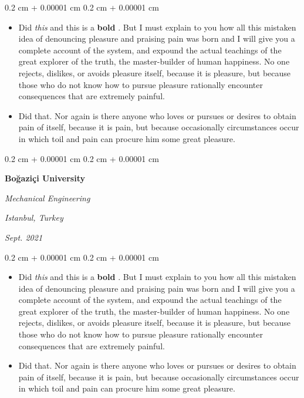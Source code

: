\documentclass[10pt, letterpaper]{article}
\newenvironment{highlights}{
    \begin{itemize}[
        topsep=0.10 cm,
        parsep=0.10 cm,
        partopsep=0pt,
        itemsep=0pt,
        leftmargin=0.4 cm + 10pt + 0.6 cm
    ]
}{
    \end{itemize}
} %
\newenvironment{onecolentry}{
    \begin{adjustwidth}{
        0.2 cm + 0.00001 cm
    }{
        0.2 cm + 0.00001 cm
    }
}{
    \end{adjustwidth}
} %
\newenvironment{threecolentry}[3][]{
    \onecolentry
    \def\thirdColumn{#3}
    \setcolumnwidth{0.6 cm, \fill, 4.5 cm}
    \begin{paracol}{3}
    #2 \switchcolumn
}{
    \switchcolumn \raggedleft \thirdColumn
    \end{paracol}
    \endonecolentry
} %
\let\hrefWithoutArrow\href
\renewcommand{\href}[2]{\hrefWithoutArrow{#1}{\mbox{\ifthenelse{\equal{#2}{}}{ }{#2 }\raisebox{.15ex}{\footnotesize \faExternalLink*}}}}
\begin{document}
        \vspace{0.10 cm-3px}
        \begin{onecolentry}
            \begin{highlights}
                \item Did \textit{this} and this is a \textbf{bold} \href{https://example.com}{link}. But I must explain to you how all this mistaken idea of denouncing pleasure and praising pain was born and I will give you a complete account of the system, and expound the actual teachings of the great explorer of the truth, the master-builder of human happiness. No one rejects, dislikes, or avoids pleasure itself, because it is pleasure, but because those who do not know how to pursue pleasure rationally encounter consequences that are extremely painful.
                \item Did that. Nor again is there anyone who loves or pursues or desires to obtain pain of itself, because it is pain, but because occasionally circumstances occur in which toil and pain can procure him some great pleasure.
            \end{highlights}
        \end{onecolentry}


        \vspace{0.2 cm-3px}

        \begin{threecolentry}{
            \vspace*{\fill}
            \textbullet
            \vspace*{3px}
            \vspace*{\fill}
        }{
        \textit{Istanbul, Turkey}    
            
        \textit{Sept. 2021}}
            \textbf{Boğaziçi University}

            \textit{Mechanical Engineering}
        \end{threecolentry}

        \vspace{0.10 cm-3px}
        \begin{onecolentry}
            \begin{highlights}
                \item Did \textit{this} and this is a \textbf{bold} \href{https://example.com}{link}. But I must explain to you how all this mistaken idea of denouncing pleasure and praising pain was born and I will give you a complete account of the system, and expound the actual teachings of the great explorer of the truth, the master-builder of human happiness. No one rejects, dislikes, or avoids pleasure itself, because it is pleasure, but because those who do not know how to pursue pleasure rationally encounter consequences that are extremely painful.
                \item Did that. Nor again is there anyone who loves or pursues or desires to obtain pain of itself, because it is pain, but because occasionally circumstances occur in which toil and pain can procure him some great pleasure.
            \end{highlights}
        \end{onecolentry}
\end{document}
